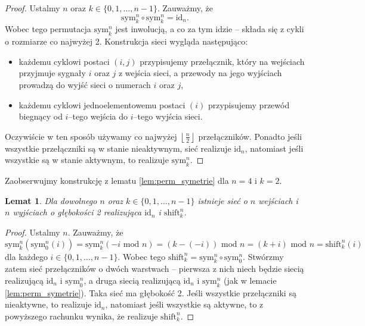 \documentclass[a4paper]{article}
\newcommand{\todo}[1]{\begin{center} \fbox{TODO: #1} \end{center}}
\renewcommand{\mod}{\,\, \text{mod} \,\,}
\newcommand{\shift}[2]{\text{shift}_{#2}^{#1}}
\newcommand{\sym}[2]{\text{sym}_{#2}^{#1}}
\newcommand{\id}[1]{\text{id}_{#1}}
\newcommand{\td}{\text{.}}
\newcommand{\floor}[1]{\left\lfloor #1 \right\rfloor}
\newtheorem{lem}[tw]{Lemat}
\theoremstyle{definition}
\begin{document}
\begin{proof}
    Ustalmy \(n\) oraz \(k \in \{0, 1, \ldots, n-1\}\). Zauważmy, że 
    \[
    \sym{n}{k} \circ \sym{n}{k} = \id{n} \td
    \]
    Wobec tego permutacja \(\sym n k\) jest inwolucją, a co za tym idzie -- składa się z cykli o rozmiarze co najwyżej 2. Konstrukcja sieci wygląda następująco:
    \begin{itemize}
        \item każdemu cyklowi postaci \((i,j)\) przypisujemy przełącznik, który na wejściach przyjmuje sygnały \(i\) oraz \(j\) z wejścia sieci, a przewody na jego wyjściach prowadzą do wyjść sieci o numerach \(i\) oraz \(j\),
        \item każdemu cyklowi jednoelementowemu postaci \((i)\) przypisujemy przewód biegnący od \(i\)--tego wejścia do \(i\)--tego wyjścia sieci.
    \end{itemize}
    Oczywiście w ten sposób używamy co najwyżej \(\floor{\frac{n}{2}}\) przełączników. 
    Ponadto jeśli wszystkie przełączniki są w stanie nieaktywnym, sieć realizuje \(\id n\), natomiast jeśli wszystkie są w stanie aktywnym, to realizuje \(\sym n k\).
\end{proof}

Zaobserwujmy konstrukcję z lematu \ref{lem:perm_symetrie} dla \(n=4\) i \(k=2\).

\todo{rysunek sieci}

\begin{lem}\label{lem:perm_shifty}
     Dla dowolnego \(n\) oraz \(k \in \{0, 1, \ldots, n-1\}\) istnieje sieć o \(n\) wejściach i \(n\) wyjściach o głębokości 2 realizująca \(\id n\) i \(\shift{n}{k}\).
\end{lem}

\begin{proof}
    Ustalmy \(n\). Zauważmy, że
    \[
    \sym n k (\sym n 0 (i)) = \sym n k (-i \mod n) = (k - (-i)) \mod n = (k + i) \mod n  = \shift n k (i)
    \]
    dla każdego \(i \in \{0, 1, \ldots, n-1\}\). Wobec tego \(\shift n k = \sym n k \circ \sym n 0\). Stwórzmy zatem sieć przełączników o dwóch warstwach -- pierwsza z nich niech będzie siecią realizującą \(\id n\) i \(\sym n 0\), a druga siecią realizującą \(\id n\) i  \(\sym n k\) (jak w lemacie \ref{lem:perm_symetrie}). Taka sieć ma głębokość 2. Jeśli wszystkie przełączniki są nieaktywne, to realizuje \(\id n\), natomiast jeśli wszystkie są aktywne, to z powyższego rachunku wynika, że realizuje \(\shift n k\).
\end{proof}
\end{document}

